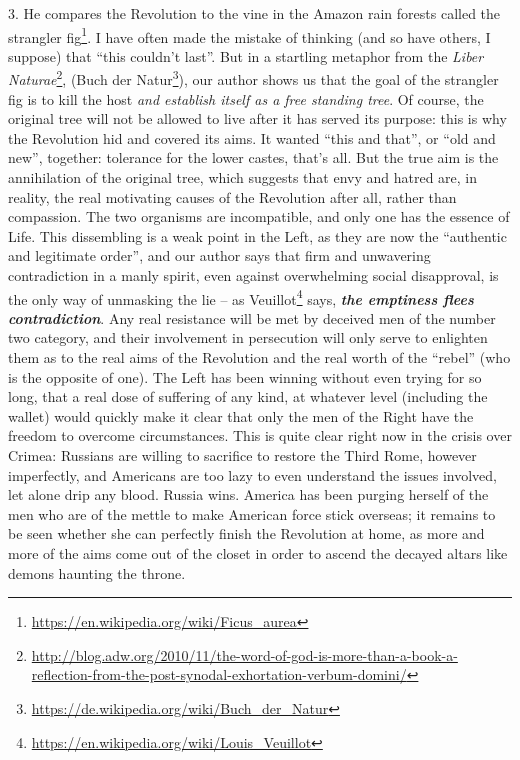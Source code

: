 3. He compares the Revolution to the vine in the Amazon rain forests called the strangler fig\footnote{\url{https://en.wikipedia.org/wiki/Ficus_aurea}}. I have often made the mistake of thinking (and so have others, I suppose) that ``this couldn't last''. But in a startling metaphor from the
\emph{Liber Naturae}\footnote{\url{http://blog.adw.org/2010/11/the-word-of-god-is-more-than-a-book-a-reflection-from-the-post-synodal-exhortation-verbum-domini/}}, (Buch der Natur\footnote{\url{https://de.wikipedia.org/wiki/Buch_der_Natur}}), our author shows us that the goal of the strangler fig is to kill the host \emph{and establish itself as a free standing tree}. Of course, the original tree will not be allowed to live after it has served its purpose: this is why the Revolution hid and covered its aims. It wanted ``this and that'', or ``old and new'', together: tolerance for the lower castes, that's all. But the true aim is the annihilation of the original tree, which suggests that envy and hatred are, in reality, the real motivating causes of the Revolution after all, rather than compassion. The two organisms are incompatible, and only one has the essence of Life. This dissembling is a weak point in the Left, as they are now the ``authentic and legitimate order'', and our author says that firm and unwavering contradiction in a manly spirit, even against overwhelming social disapproval, is the only way of unmasking the lie -- as Veuillot\footnote{\url{https://en.wikipedia.org/wiki/Louis_Veuillot}} says, \textbf{\emph{the emptiness flees contradiction}}. Any real resistance will be met by deceived men of the number two category, and their involvement in persecution will only serve to enlighten them as to the real aims of the Revolution and the real worth of the ``rebel'' (who is the opposite of one). The Left has been winning without even trying for so long, that a real dose of suffering of any kind, at whatever level (including the wallet) would quickly make it clear that only the men of the Right have the freedom to overcome circumstances. This is quite clear right now in the crisis over Crimea: Russians are willing to sacrifice to restore the Third Rome, however imperfectly, and Americans are too lazy to even understand the issues involved, let alone drip any blood. Russia wins. America has been purging herself of the men who are of the mettle to make American force stick overseas; it remains to be seen whether she can perfectly finish the Revolution at home, as more and more of the aims come out of the closet in order to ascend the decayed altars like demons haunting the throne.

